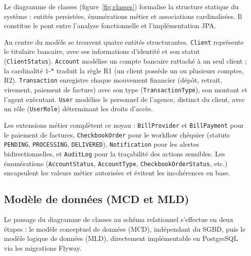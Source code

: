 \documentclass[11pt,a4paper,oneside]{report}
\begin{document}
Le diagramme de classes (figure~\ref{fig:classes}) formalise la structure statique du système : entités persistées, énumérations métier et associations cardinalisées. Il constitue le pont entre l'analyse fonctionnelle et l'implémentation JPA.


Au centre du modèle se trouvent quatre entités structurantes. \texttt{Client} représente le titulaire bancaire, avec ses informations d'identité et son statut (\texttt{ClientStatus}). \texttt{Account} modélise un compte bancaire rattaché à un seul client ; la cardinalité $1$-$*$ traduit la règle R1 (un client possède un ou plusieurs comptes, R2). \texttt{Transaction} enregistre chaque mouvement financier (dépôt, retrait, virement, paiement de facture) avec son type (\texttt{TransactionType}), son montant et l'agent exécutant. \texttt{User} modélise le personnel de l'agence, distinct du client, avec un rôle (\texttt{UserRole}) déterminant les droits d'accès.

Les extensions métier complètent ce noyau : \texttt{BillProvider} et \texttt{BillPayment} pour le paiement de factures, \texttt{CheckbookOrder} pour le workflow chéquier (statuts \texttt{PENDING}, \texttt{PROCESSING}, \texttt{DELIVERED}), \texttt{Notification} pour les alertes bidirectionnelles, et \texttt{AuditLog} pour la traçabilité des actions sensibles. Les énumérations (\texttt{AccountStatus}, \texttt{AccountType}, \texttt{CheckbookOrderStatus}, etc.) encapsulent les valeurs métier autorisées et évitent les incohérences en base.

\subsection{Modèle de données (MCD et MLD)}

Le passage du diagramme de classes au schéma relationnel s'effectue en deux étapes : le modèle conceptuel de données (MCD), indépendant du SGBD, puis le modèle logique de données (MLD), directement implémentable en PostgreSQL via les migrations Flyway.
\end{document}
